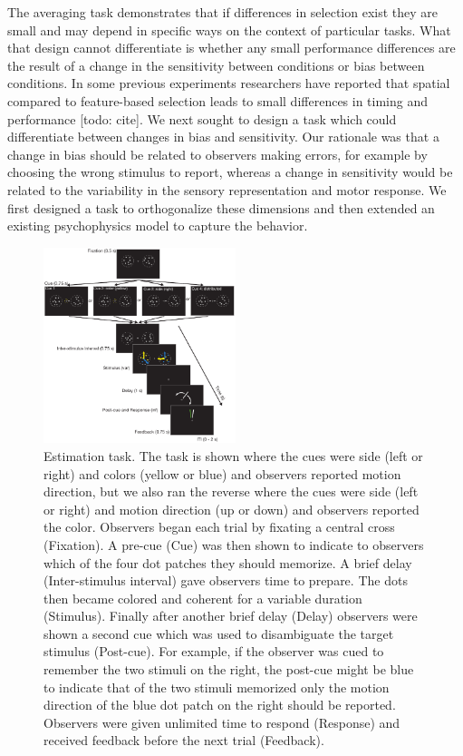 The averaging task demonstrates that if differences in selection exist they are small and may depend in specific ways on the context of particular tasks. What that design cannot differentiate is whether any small performance differences are the result of a change in the sensitivity between conditions or bias between conditions. In some previous experiments researchers have reported that spatial compared to feature-based selection leads to small differences in timing \citep{Liu2007-ed} and performance [todo: cite]. We next sought to design a task which could differentiate between changes in bias and sensitivity. Our rationale was that a change in bias should be related to observers making errors, for example by choosing the wrong stimulus to report, whereas a change in sensitivity would be related to the variability in the sensory representation and motor response. We first designed a task to orthogonalize these dimensions and then extended an existing psychophysics model to capture the behavior. 

\begin{figure}
\centering
\includegraphics[keepaspectratio,width=0.5\textwidth]{figs_c4/f4_estimationtask.pdf}
\caption[Estimation task]{Estimation task. The task is shown where the cues were side (left or right) and colors (yellow or blue) and observers reported motion direction, but we also ran the reverse where the cues were side (left or right) and motion direction (up or down) and observers reported the color. Observers began each trial by fixating a central cross (Fixation). A pre-cue (Cue) was then shown to indicate to observers which of the four dot patches they should memorize. A brief delay (Inter-stimulus interval) gave observers time to prepare. The dots then became colored and coherent for a variable duration (Stimulus). Finally after another brief delay (Delay) observers were shown a second cue which was used to disambiguate the target stimulus (Post-cue). For example, if the observer was cued to remember the two stimuli on the right, the post-cue might be blue to indicate that of the two stimuli memorized only the motion direction of the blue dot patch on the right should be reported. Observers were given unlimited time to respond (Response) and received feedback before the next trial (Feedback).}
\label{fig:c4f4}
\end{figure}

